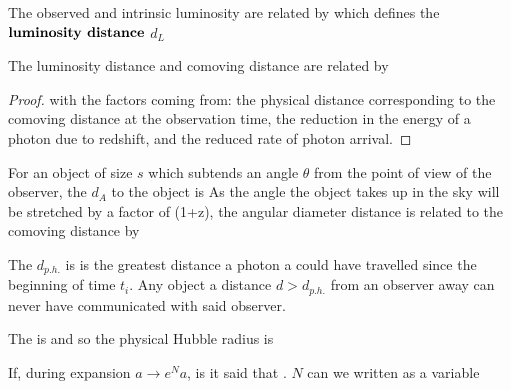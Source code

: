 \documentclass{article}
\begin{document}
\begin{definition}
The observed and intrinsic luminosity are related by 
which defines the $\textbf{luminosity distance}$ $d_L$
 \end{definition}
 
 \begin{prop}
 The luminosity distance and comoving distance are related by 
 \end{prop}
\begin{proof}
with the factors coming from: the physical distance corresponding to the comoving distance at the observation time, the reduction in the energy of a photon due to redshift, and the reduced rate of photon arrival. 
\end{proof}

\begin{definition}
For an object of size $s$ which subtends an angle $\theta$ from the point of view of the observer, the  $d_A$ to the object is 
As the angle the object takes up in the sky will be stretched by a factor of (1+z), the angular diameter distance is related to the comoving distance by 
\end{definition}

\begin{definition}
The  $d_{p.h.}$ is is the greatest distance a photon a could have travelled since the beginning of time $t_i$. Any object a distance $d>d_{p.h.}$ from an observer away can never have communicated with said observer. 
\end{definition}

\begin{definition}
The  is 
and so the physical Hubble radius is 
\end{definition}

\begin{definition}[e-folds]
If, during expansion $a \to e^N a$, is it said that . $N$ can we written as a variable 
\end{definition}
\end{document}
